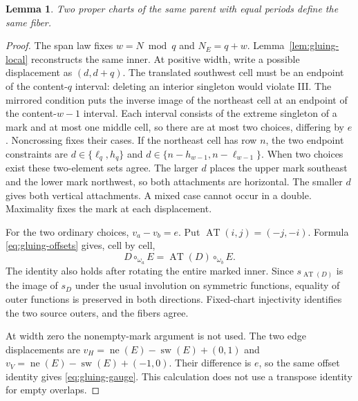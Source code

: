 \documentclass[11pt,a4paper]{amsart}
\numberwithin{equation}{section}
\theoremstyle{plain}
\newtheorem{lemma}[theorem]{Lemma}
\theoremstyle{definition}
\begin{document}
\begin{lemma}\label{lem:gluing-equal}
Two proper charts of the same parent with equal periods define the same fiber.
\end{lemma}
\begin{proof}
The span law fixes \(w=N\bmod q\) and \(N_E=q+w\).  Lemma~\ref{lem:gluing-local} reconstructs the same inner.  At positive width, write a possible displacement as \((d,d+q)\).  The translated southwest cell must be an endpoint of the content-\(q\) interval: deleting an interior singleton would violate III.  The mirrored condition puts the inverse image of the northeast cell at an endpoint of the content-\(w-1\) interval.  Each interval consists of the extreme singleton of a mark and at most one middle cell, so there are at most two choices, differing by \(e\).  Noncrossing fixes their cases.  If the northeast cell has row \(n\), the two endpoint constraints are \(d\in\{\ell_q,h_q\}\) and \(d\in\{n-h_{w-1},n-\ell_{w-1}\}\).  When two choices exist these two-element sets agree.  The larger \(d\) places the upper mark southeast and the lower mark northwest, so both attachments are horizontal.  The smaller \(d\) gives both vertical attachments.  A mixed case cannot occur in a double.  Maximality fixes the mark at each displacement.

For the two ordinary choices, \(v_a-v_b=e\).  Put \(\operatorname{AT}(i,j)=(-j,-i)\).  Formula \eqref{eq:gluing-offsets} gives, cell by cell,
\begin{equation}\label{eq:gluing-gauge}
 D\circ_{\omega_a}E=\operatorname{AT}(D)\circ_{\omega_b}E.
\end{equation}
The identity also holds after rotating the entire marked inner.  Since \(s_{\operatorname{AT}(D)}\) is the image of \(s_D\) under the usual involution on symmetric functions, equality of outer functions is preserved in both directions.  Fixed-chart injectivity identifies the two source outers, and the fibers agree.

At width zero the nonempty-mark argument is not used.  The two edge displacements are
\(v_H=\operatorname{ne}(E)-\operatorname{sw}(E)+(0,1)\) and
\(v_V=\operatorname{ne}(E)-\operatorname{sw}(E)+(-1,0)\).
Their difference is \(e\), so the same offset identity gives \eqref{eq:gluing-gauge}.  This calculation does not use a transpose identity for empty overlaps.
\end{proof}
\end{document}
